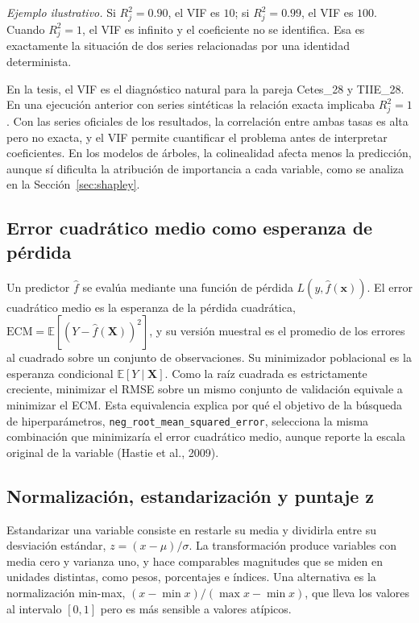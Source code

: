 \textit{Ejemplo ilustrativo.} Si $R_j^2=0.90$, el VIF es $10$; si $R_j^2=0.99$, el VIF es $100$. Cuando $R_j^2=1$, el VIF es infinito y el coeficiente no se identifica. Esa es exactamente la situación de dos series relacionadas por una identidad determinista.

En la tesis, el VIF es el diagnóstico natural para la pareja Cetes\_28 y TIIE\_28. En una ejecución anterior con series sintéticas la relación exacta implicaba $R_j^2=1$. Con las series oficiales de los resultados, la correlación entre ambas tasas es alta pero no exacta, y el VIF permite cuantificar el problema antes de interpretar coeficientes. En los modelos de árboles, la colinealidad afecta menos la predicción, aunque sí dificulta la atribución de importancia a cada variable, como se analiza en la Sección~\ref{sec:shapley}.

\subsection{Error cuadrático medio como esperanza de pérdida}
Un predictor $\hat{f}$ se evalúa mediante una función de pérdida $L(y,\hat{f}(\mathbf{x}))$. El error cuadrático medio es la esperanza de la pérdida cuadrática, $\text{ECM}=\mathbb{E}[(Y-\hat{f}(\mathbf{X}))^2]$, y su versión muestral es el promedio de los errores al cuadrado sobre un conjunto de observaciones. Su minimizador poblacional es la esperanza condicional $\mathbb{E}[Y\mid\mathbf{X}]$. Como la raíz cuadrada es estrictamente creciente, minimizar el RMSE sobre un mismo conjunto de validación equivale a minimizar el ECM. Esta equivalencia explica por qué el objetivo de la búsqueda de hiperparámetros, \texttt{neg\_root\_mean\_squared\_error}, selecciona la misma combinación que minimizaría el error cuadrático medio, aunque reporte la escala original de la variable (Hastie et al., 2009).

\subsection{Normalización, estandarización y puntaje z}
Estandarizar una variable consiste en restarle su media y dividirla entre su desviación estándar, $z=(x-\mu)/\sigma$. La transformación produce variables con media cero y varianza uno, y hace comparables magnitudes que se miden en unidades distintas, como pesos, porcentajes e índices. Una alternativa es la normalización min-max, $(x-\min x)/(\max x-\min x)$, que lleva los valores al intervalo $[0,1]$ pero es más sensible a valores atípicos.

